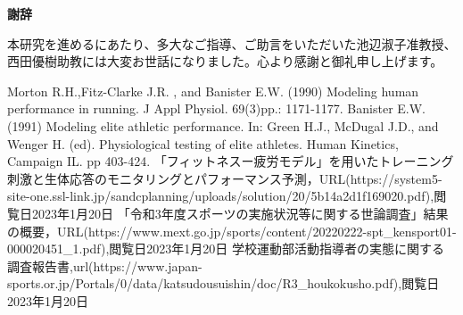 \documentclass[12pt,fleqn]{jreport}
\begin{document}
\newpage
\begin{flushleft}
  {\Huge\textbf{謝辞}}
\end{flushleft}
\vspace{2cm}
本研究を進めるにあたり、多大なご指導、ご助言をいただいた池辺淑子准教授、西田優樹助教には大変お世話になりました。心より感謝と御礼申し上げます。
\newpage
\begin{thebibliography}{99}
  Morton R.H.,Fitz-Clarke J.R. , and Banister E.W. (1990) Modeling human performance in running. J Appl Physiol. 69(3)pp.: 1171-1177.
  Banister E.W. (1991) Modeling elite athletic performance. In: Green H.J., McDugal J.D., and Wenger H. (ed). Physiological testing of elite athletes. Human Kinetics, Campaign IL. pp 403-424.
  「フィットネスー疲労モデル」を用いたトレーニング刺激と生体応答のモニタリングとパフォーマンス予測，URL(https://system5-site-one.ssl-link.jp/sandcplanning/uploads/solution/20/5b14a2d1f169020.pdf),閲覧日2023年1月20日
  「令和3年度スポーツの実施状況等に関する世論調査」結果の概要，URL(https://www.mext.go.jp/sports/content/20220222-spt\_kensport01-000020451\_1.pdf),閲覧日2023年1月20日
  学校運動部活動指導者の実態に関する調査報告書,url(https://www.japan-sports.or.jp/Portals/0/data/katsudousuishin/doc/R3\_houkokusho.pdf),閲覧日2023年1月20日
\end{thebibliography}
\end{document}
